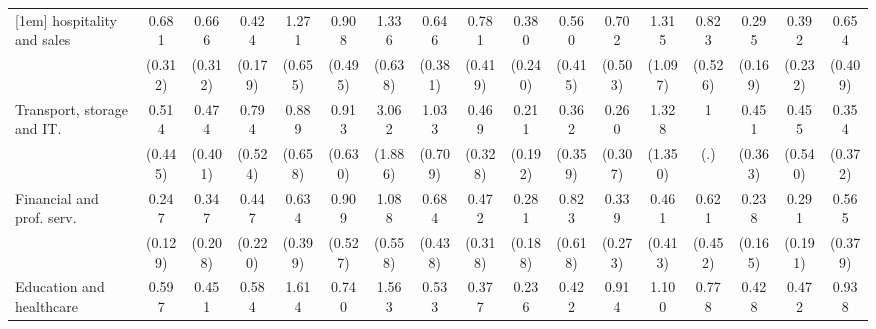 {\begin{tabular}{l*{16}{c}}
[1em]
hospitality and sales&       0.681         &       0.666         &       0.424\sym{*}  &       1.271         &       0.908         &       1.336         &       0.646         &       0.781         &       0.380         &       0.560         &       0.702         &       1.315         &       0.823         &       0.295\sym{*}  &       0.392         &       0.654         \\
                    &     (0.312)         &     (0.312)         &     (0.179)         &     (0.655)         &     (0.495)         &     (0.638)         &     (0.381)         &     (0.419)         &     (0.240)         &     (0.415)         &     (0.503)         &     (1.097)         &     (0.526)         &     (0.169)         &     (0.232)         &     (0.409)         \\
[1em]
Transport, storage and IT.&       0.514         &       0.474         &       0.794         &       0.889         &       0.913         &       3.062         &       1.033         &       0.469         &       0.211         &       0.362         &       0.260         &       1.328         &           1         &       0.451         &       0.455         &       0.354         \\
                    &     (0.445)         &     (0.401)         &     (0.524)         &     (0.658)         &     (0.630)         &     (1.886)         &     (0.709)         &     (0.328)         &     (0.192)         &     (0.359)         &     (0.307)         &     (1.350)         &         (.)         &     (0.363)         &     (0.540)         &     (0.372)         \\
[1em]
Financial and prof. serv.&       0.247\sym{**} &       0.347         &       0.447         &       0.634         &       0.909         &       1.088         &       0.684         &       0.472         &       0.281         &       0.823         &       0.339         &       0.461         &       0.621         &       0.238\sym{*}  &       0.291         &       0.565         \\
                    &     (0.129)         &     (0.208)         &     (0.220)         &     (0.399)         &     (0.527)         &     (0.558)         &     (0.438)         &     (0.318)         &     (0.188)         &     (0.618)         &     (0.273)         &     (0.413)         &     (0.452)         &     (0.165)         &     (0.191)         &     (0.379)         \\
[1em]
Education and healthcare&       0.597         &       0.451         &       0.584         &       1.614         &       0.740         &       1.563         &       0.533         &       0.377         &       0.236\sym{*}  &       0.422         &       0.914         &       1.100         &       0.778         &       0.428         &       0.472         &       0.938         \\

\end{tabular}}
